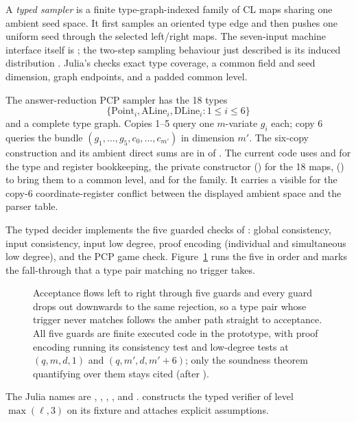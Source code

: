A \emph{typed sampler} is a finite type-graph-indexed family of CL maps sharing
one ambient seed space.  It first samples an oriented type edge and then pushes
one uniform seed through the selected left/right maps.  The seven-input
machine interface itself is ; the two-step sampling
behaviour just described is its induced distribution
.
Julia's  checks exact type coverage, a common field and seed
dimension, graph endpoints, and a padded common level.

The answer-reduction PCP sampler has the 18 types
\[
 \{\mathrm{Point}_i,\mathrm{ALine}_i,\mathrm{DLine}_i:1\leq i\leq6\}
\]
and a complete type graph.  Copies 1--5 query one \(m\)-variate \(g_i\) each;
copy 6 queries the bundle \((g_1,\ldots,g_5,c_0,\ldots,c_{m'})\) in dimension
\(m'\).  The six-copy construction and its ambient direct sums are in
 of
.
The current code uses  and  for the
type and register bookkeeping, the private constructor 
() for the 18 maps, 
() to bring them to a common level, and
 for the family.  It carries a visible
 for the copy-6 coordinate-register conflict between the
displayed ambient space and the parser table.

The typed decider implements the five guarded checks of
: global consistency, input consistency, input low degree,
proof encoding (individual and simultaneous low degree), and the PCP game
check.
Figure~\ref{fig:D-decider-guards} runs the five in order and marks the
fall-through that a type pair matching no trigger takes.
\begin{figure}[H]
\centering

\caption{Acceptance flows left to right through five guards and every guard drops out downwards to the same rejection, so a type pair whose trigger never matches follows the amber path straight to acceptance.  All five guards are finite executed code in the prototype, with proof encoding running its consistency test and low-degree tests at \((q,m,d,1)\) and \((q,m',d,m'+6)\); only the soundness theorem quantifying over them stays cited (after ).}
\label{fig:D-decider-guards}
\end{figure}
The Julia names are ,
, , , and
.   constructs the typed verifier of
level \(\max(\ell,3)\) on its fixture and attaches explicit assumptions.

